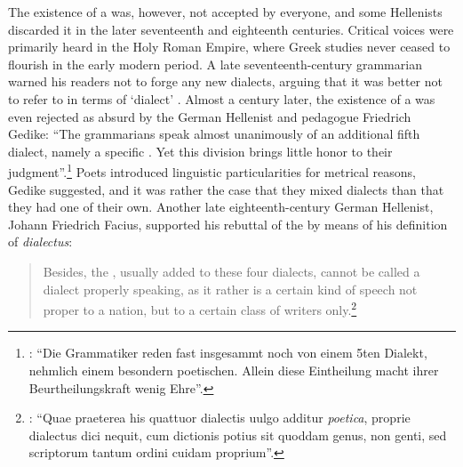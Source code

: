 The existence of a  was, however, not accepted by everyone, and some Hellenists discarded it in the later seventeenth and eighteenth centuries. Critical voices were primarily heard in the Holy Roman Empire, where Greek studies never ceased to flourish in the early modern period. A late seven\-teenth-century grammarian warned his readers not to forge any new dialects, arguing that it was better not to refer to  in terms of ‘dialect’ \citep[512]{Ursin1691}. Almost a century later, the existence of a  was even rejected as absurd by the German Hellenist and pedagogue Friedrich Gedike: “The grammarians speak almost unanimously of an additional fifth dialect, namely a specific . Yet this division brings little honor to their judgment”.\footnote{\citet[21]{Gedike1782}: “Die Grammatiker reden fast insgesammt noch von einem 5ten Dialekt, nehmlich einem besondern poetischen. Allein diese Eintheilung macht ihrer Beurtheilungskraft wenig Ehre”.} Poets introduced linguistic particularities for metrical reasons, Gedike suggested, and it was rather the case that they mixed dialects than that they had one of their own. Another late eighteenth-century German Hellenist, Johann Friedrich Facius, supported his rebuttal of the  by means of his definition of \textit{dialectus}:

\begin{quote}
Besides, the , usually added to these four dialects, cannot be called a dialect properly speaking, as it rather is a certain kind of speech not proper to a nation, but to a certain class of writers only.\footnote{\citet[\textsc{v}]{Facius1782}: “Quae praeterea his quattuor dialectis uulgo additur \textit{poetica}, proprie dialectus dici nequit, cum dictionis potius sit quoddam genus, non genti, sed scriptorum tantum ordini cuidam proprium”.}
\end{quote}

